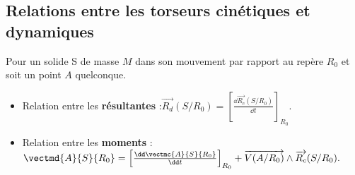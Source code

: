 %
%
%
%
%

\subsection{Relations entre les torseurs cinétiques et dynamiques}
\begin{prop}
Pour un solide S de masse $M$ dans son mouvement par rapport au repère $R_0$ et soit un point $A$ quelconque.
\begin{itemize}
\item Relation entre les \textbf{résultantes} :$
\overrightarrow{R_d}(S/R_0)=\left[\frac{\dd \overrightarrow{R_c}(S/R_0)}{\dd t}\right]_{R_0}.$
\item Relation entre les \textbf{moments} :
$\vectmd{A}{S}{R_0}=\left[\frac{\dd \vectmc{A}{S}{R_0}}{\dd t}\right]_{R_0}+\overrightarrow{V(A/R_0)}\wedge \overrightarrow{R_c}(S/R_0).$
\end{itemize}
\end{prop}




